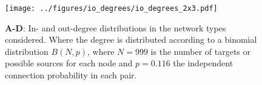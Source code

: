 

\begin{figure}[h]
  \texttt{[image: ../figures/io\_degrees/io\_degrees\_2x3.pdf]} %
  \caption{\textbf{A-D}: In- and out-degree distributions in the
    network types considered. Where the degree is distributed
    according to a binomial distribution $B(N,p)$, where $N=999$ is
    the number of targets or possible sources for each node and
    $p=0.116$ the independent connection probability in each pair.}
\label{fig:io_deg}
\end{figure}


